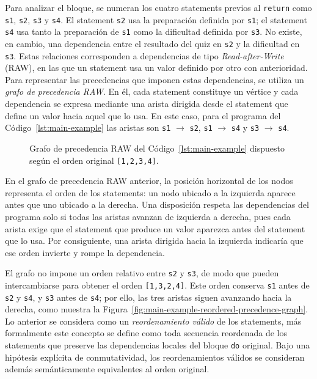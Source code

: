 Para analizar el bloque, se numeran los cuatro statements previos al \texttt{return} como \texttt{s1}, \texttt{s2}, \texttt{s3} y \texttt{s4}. El statement \texttt{s2} usa la preparación definida por \texttt{s1}; el statement \texttt{s4} usa tanto la preparación de \texttt{s1} como la dificultad definida por \texttt{s3}. No existe, en cambio, una dependencia entre el resultado del quiz en \texttt{s2} y la dificultad en \texttt{s3}. Estas relaciones corresponden a dependencias de tipo \textit{Read-after-Write} (RAW), en las que un statement usa un valor definido por otro con anterioridad. Para representar las precedencias que imponen estas dependencias, se utiliza un \textit{grafo de precedencia RAW}. En él, cada statement constituye un vértice y cada dependencia se expresa mediante una arista dirigida desde el statement que define un valor hacia aquel que lo usa. En este caso, para el programa del Código~\ref{lst:main-example} las aristas son \texttt{s1} $\to$ \texttt{s2}, \texttt{s1} $\to$ \texttt{s4} y \texttt{s3} $\to$ \texttt{s4}.

\begin{figure}[ht]
\centering
\begin{PrecedenceGraph}

\end{PrecedenceGraph}
\caption{Grafo de precedencia RAW del Código~\ref{lst:main-example} dispuesto según el orden original \texttt{[1,2,3,4]}.}
\label{fig:main-example-precedence-graph}
\end{figure}

En el grafo de precedencia RAW anterior, la posición horizontal de los nodos representa el orden de los statements: un nodo ubicado a la izquierda aparece antes que uno ubicado a la derecha. Una disposición respeta las dependencias del programa solo si todas las aristas avanzan de izquierda a derecha, pues cada arista exige que el statement que produce un valor aparezca antes del statement que lo usa. Por consiguiente, una arista dirigida hacia la izquierda indicaría que ese orden invierte y rompe la dependencia.

El grafo no impone un orden relativo entre \texttt{s2} y \texttt{s3}, de modo que pueden intercambiarse para obtener el orden \texttt{[1,3,2,4]}. Este orden conserva \texttt{s1} antes de \texttt{s2} y \texttt{s4}, y \texttt{s3} antes de \texttt{s4}; por ello, las tres aristas siguen avanzando hacia la derecha, como muestra la Figura~\ref{fig:main-example-reordered-precedence-graph}. Lo anterior se considera como un \textit{reordenamiento válido} de los statements, más formalmente este concepto se define como toda secuencia reordenada de los statements que preserve las dependencias locales del bloque \texttt{do} original. Bajo una hipótesis explícita de conmutatividad, los reordenamientos válidos se consideran además semánticamente equivalentes al orden original.

